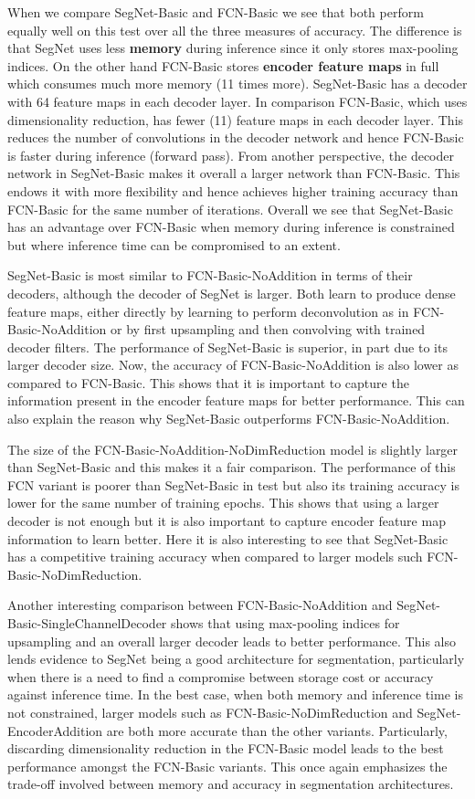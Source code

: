 When we compare SegNet-Basic and FCN-Basic we see that both perform equally well on this test over all the three measures of accuracy. The difference is that SegNet uses less \textbf{memory} during inference since it only stores max-pooling indices. On the other hand FCN-Basic stores \textbf{encoder feature maps} in full which consumes much more memory (11 times more). SegNet-Basic has a decoder with 64 feature maps in each decoder layer. In comparison FCN-Basic, which uses dimensionality reduction, has fewer (11) feature maps in each decoder layer. This reduces the number of convolutions in the decoder network and hence FCN-Basic is faster during inference (forward pass). From another perspective, the decoder network in SegNet-Basic makes it overall a larger network than FCN-Basic. This endows it with more flexibility and hence achieves higher training accuracy than FCN-Basic for the same number of iterations. Overall we see that SegNet-Basic has an advantage over FCN-Basic when memory during inference is constrained but where inference time can be compromised to an extent. 

SegNet-Basic is most similar to FCN-Basic-NoAddition in terms of their decoders, although the decoder of SegNet is larger. Both learn to produce dense feature maps, either directly by learning to perform deconvolution as in FCN-Basic-NoAddition or by first upsampling and then convolving with trained decoder filters. 
The performance of SegNet-Basic is superior, in part due to its larger decoder size. Now, the accuracy of FCN-Basic-NoAddition is also lower as compared to FCN-Basic. This shows that it is important to capture the information present in the encoder feature maps for better performance. This can also explain the reason why SegNet-Basic outperforms FCN-Basic-NoAddition. 

The size of the FCN-Basic-NoAddition-NoDimReduction model is slightly larger than SegNet-Basic and this makes it a fair comparison. The performance of this FCN variant is poorer than SegNet-Basic in test but also its training accuracy is lower for the same number of training epochs. This shows that using a larger decoder is not enough but it is also important to capture encoder feature map information to learn better. Here it is also interesting to see that SegNet-Basic has a competitive training accuracy when compared to larger models such FCN-Basic-NoDimReduction. 

Another interesting comparison between FCN-Basic-NoAddition and SegNet-Basic-SingleChannelDecoder shows that using max-pooling indices for upsampling and an overall larger decoder leads to better performance. This also lends evidence to SegNet being a good architecture for segmentation, particularly when there is a need to find a compromise between storage cost or accuracy against inference time. In the best case, when both memory and inference time is not constrained, larger models such as FCN-Basic-NoDimReduction and SegNet-EncoderAddition are both more accurate than the other variants. Particularly, discarding dimensionality reduction in the FCN-Basic model leads to the best performance amongst the FCN-Basic variants. This once again emphasizes the trade-off involved between memory and accuracy in segmentation architectures.

